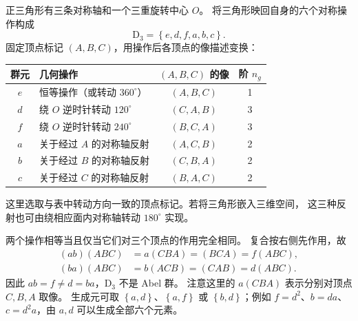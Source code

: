 \begin{example}
正三角形有三条对称轴和一个三重旋转中心 $O$。
将三角形映回自身的六个对称操作构成
\begin{equation}
\mathrm{D}_3=\left\{e,d,f,a,b,c\right\}.
\end{equation}
固定顶点标记 $\left(A,B,C\right)$，用操作后各顶点的像描述变换：
\begin{center}
\begin{tabular}{clcc}
\toprule
群元 & 几何操作 & $\left(A,B,C\right)$ 的像 & 阶 $n_g$\\
\midrule
$e$ & 恒等操作（或转动 $360^\circ$） & $\left(A,B,C\right)$ & 1\\
$d$ & 绕 $O$ 逆时针转动 $120^\circ$ & $\left(C,A,B\right)$ & 3\\
$f$ & 绕 $O$ 逆时针转动 $240^\circ$ & $\left(B,C,A\right)$ & 3\\
$a$ & 关于经过 $A$ 的对称轴反射 & $\left(A,C,B\right)$ & 2\\
$b$ & 关于经过 $B$ 的对称轴反射 & $\left(C,B,A\right)$ & 2\\
$c$ & 关于经过 $C$ 的对称轴反射 & $\left(B,A,C\right)$ & 2\\
\bottomrule
\end{tabular}
\end{center}
这里选取与表中转动方向一致的顶点标记。若将三角形嵌入三维空间，
这三种反射也可由绕相应面内对称轴转动 $180^\circ$ 实现。

两个操作相等当且仅当它们对三个顶点的作用完全相同。
复合按右侧先作用，故
\begin{align}
\left(ab\right)\left(ABC\right)&=a\left(CBA\right)=\left(BCA\right)=f\left(ABC\right),\\
\left(ba\right)\left(ABC\right)&=b\left(ACB\right)=\left(CAB\right)=d\left(ABC\right).
\end{align}
因此 $ab=f\ne d=ba$，$\mathrm{D}_3$ 不是 Abel 群。
注意这里的 $a\left(CBA\right)$ 表示分别对顶点 $C,B,A$ 取像。
生成元可取 $\left\{a,d\right\}$、$\left\{a,f\right\}$ 或 $\left\{b,d\right\}$；例如
$f=d^2$、$b=da$、$c=d^2a$，由 $a,d$ 可以生成全部六个元素。
\end{example}

